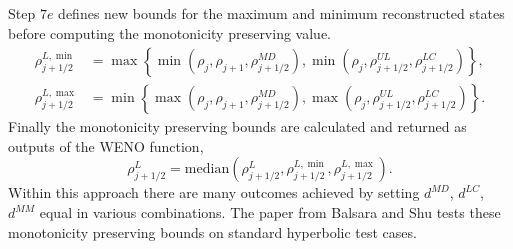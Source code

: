 	Step $7e$ defines new bounds for the maximum and minimum reconstructed states before computing the monotonicity preserving value.
	\begin{align}
		\rho_{j+1/2}^{L,\min}&=\max\left\{\min\left(\rho_j,\rho_{j+1},\rho_{j+1/2}^{MD}\right),\min\left(\rho_j,\rho_{j+1/2}^{UL},\rho_{j+1/2}^{LC}\right)\right\},\\
		\rho_{j+1/2}^{L,\max}&=\min\left\{\max\left(\rho_j,\rho_{j+1},\rho_{j+1/2}^{MD}\right),\max\left(\rho_j,\rho_{j+1/2}^{UL},\rho_{j+1/2}^{LC}\right)\right\}.
	\end{align}
	Finally the monotonicity preserving bounds are calculated and returned as outputs of the WENO function,
	\begin{equation}
		\rho_{j+1/2}^L=\mathrm{median}(\rho^L_{j+1/2},\rho^{L,\min}_{j+1/2},\rho^{L,\max}_{j+1/2}).
	\end{equation}
	Within this approach there are many outcomes achieved by setting $d^{MD}$, $d^{LC}$, $d^{MM}$ equal in various combinations. The paper from Balsara and Shu \cite{BalsaraShu00} tests these monotonicity preserving bounds on standard hyperbolic test cases. 
	












